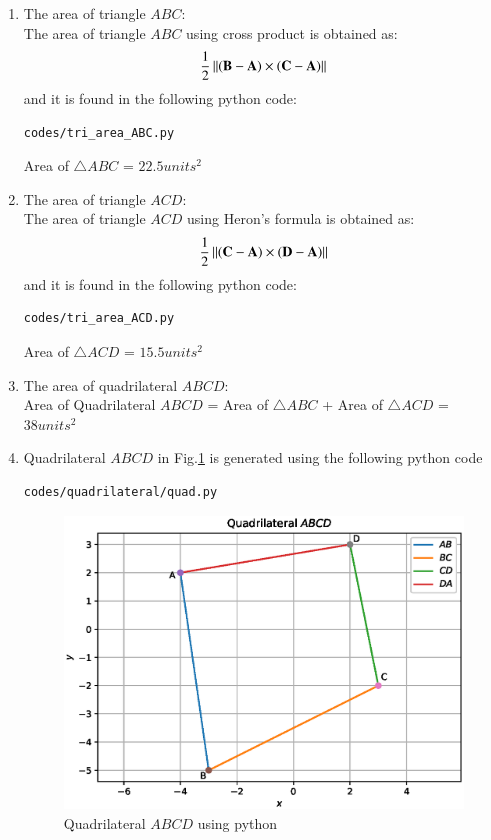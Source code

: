 \renewcommand{\theequation}{\theenumi}
\begin{enumerate}[label=\arabic*.,ref=\thesubsection.\theenumi]
\item The area of triangle $ABC$: \\
\solution The area of triangle $ABC$ using cross product is obtained as:
$$\frac{1}{2}\left\lVert(\mathbf{B}-\mathbf{A})\times(\mathbf{C}-\mathbf{A})\right\rVert$$
and it is found in the following python code:
\begin{lstlisting}
codes/tri_area_ABC.py
\end{lstlisting} 

Area of $\triangle{ABC}$ = $22.5 units^2$

\item The area of triangle $ACD$: \\
\solution The area of triangle $ACD$ using Heron's formula is obtained as:
$$\frac{1}{2}\left\lVert(\mathbf{C}-\mathbf{A})\times(\mathbf{D}-\mathbf{A})\right\rVert$$
and it is found in the following python code:
\begin{lstlisting}
codes/tri_area_ACD.py
\end{lstlisting} 

Area of $\triangle{ACD}$ = $15.5 units^2$

\item The area of quadrilateral $ABCD$: \\
\solution Area of Quadrilateral $ABCD$ = Area of $\triangle{ABC}$ + Area of $\triangle{ACD}$ = $38 units^2$ 

\item Quadrilateral $ABCD$ in Fig.\ref{fig:quad_1} is generated using the following python code 
\begin{lstlisting}
codes/quadrilateral/quad.py
\end{lstlisting}
\begin{figure}[!ht]
\centering
\includegraphics[width=\columnwidth]{./codes/quadrilateral/quad.eps}
\caption{Quadrilateral $ABCD$ using python}
\label{fig:quad_1}
\end{figure} 
\end{enumerate}